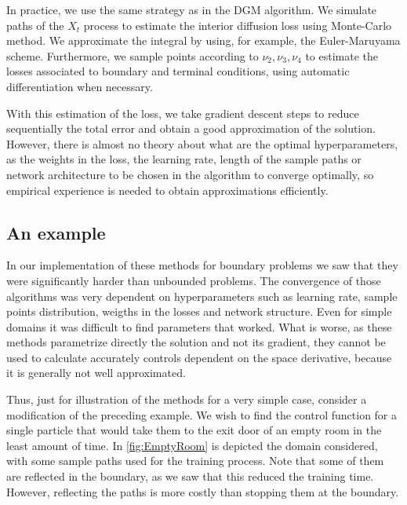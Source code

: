 In practice, we use the same strategy as in the DGM algorithm. We simulate paths  of the $X_t$ process to estimate the interior diffusion loss using Monte-Carlo method. We approximate the integral by using, for example, the Euler-Maruyama scheme. Furthermore, we sample points according to $\nu_2,\nu_3,\nu_4$ to estimate the losses associated to boundary and terminal conditions, using automatic differentiation when necessary. 

With this estimation of the loss, we take gradient descent steps to reduce sequentially the total error and obtain a good approximation of the solution. However, there is almost no theory about what are the optimal hyperparameters, as the weights in the loss, the learning rate, length of the sample paths or network architecture to be chosen in the algorithm to converge optimally, so empirical experience is needed to obtain approximations efficiently.


\subsection{An example}
In our implementation of these methods for boundary problems we saw that they were significantly harder than unbounded problems. The convergence of those algorithms was very dependent on hyperparameters such as learning rate, sample points distribution, weigths in the losses and network structure. Even for simple domains it was difficult to find parameters that worked. What is worse, as these methods parametrize directly the solution and not its gradient, they cannot be used to calculate accurately controls dependent on the space derivative, because it is generally not well approximated.   

Thus, just for illustration of the methods for a very simple case, consider a modification of the preceding example. We wish to find the control function for a single particle that would take them to the exit door of an empty room in the least amount of time. In \autoref{fig:EmptyRoom} is depicted the domain considered, with some sample paths used for the training process. Note that some of them are reflected in the boundary, as we saw that this reduced the training time. However, reflecting the paths is more costly than stopping them at the boundary.

